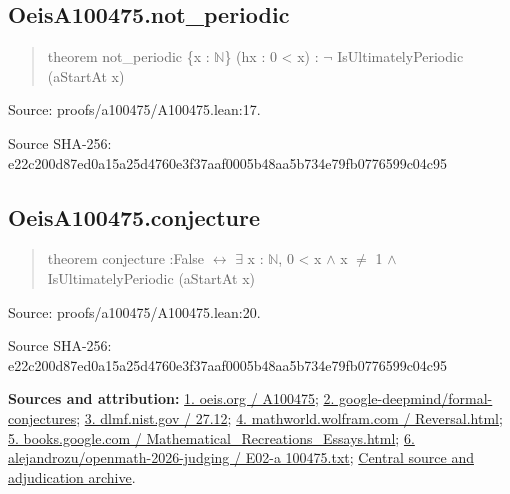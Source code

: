 \documentclass[11pt,a4paper]{article}
\begin{document}
\begin{samepage}
\subsection{OeisA100475.not\_periodic}
\begin{quote}\small\ttfamily theorem not\_periodic \{x : \ensuremath{\mathbb{N}}\} (hx : 0 < x) : \ensuremath{\neg} IsUltimatelyPeriodic (aStartAt x)\end{quote}
{\small Source: proofs/a100475/A100475.lean:17.\par}

{\small Source SHA-256: e22c200d87ed0a15a25d4760e3f37aaf0005b48aa5b734e79fb0776599c04c95\par}

\end{samepage}
\begin{samepage}
\subsection{OeisA100475.conjecture}
\begin{quote}\small\ttfamily theorem conjecture :\newline     False \ensuremath{\leftrightarrow} \ensuremath{\exists} x : \ensuremath{\mathbb{N}}, 0 < x \ensuremath{\wedge} x \ensuremath{\neq} 1 \ensuremath{\wedge} IsUltimatelyPeriodic (aStartAt x)\end{quote}
{\small Source: proofs/a100475/A100475.lean:20.\par}

{\small Source SHA-256: e22c200d87ed0a15a25d4760e3f37aaf0005b48aa5b734e79fb0776599c04c95\par}

{\small\textbf{Sources and attribution:} \href{https://oeis.org/A100475}{1. oeis.org / A100475}; \href{https://github.com/google-deepmind/formal-conjectures/pull/5567}{2. google-deepmind/formal-conjectures}; \href{https://dlmf.nist.gov/27.12\#E2}{3. dlmf.nist.gov / 27.12}; \href{https://mathworld.wolfram.com/Reversal.html}{4. mathworld.wolfram.com / Reversal.html}; \href{https://books.google.com/books/about/Mathematical_Recreations_Essays.html?id=9lJqNJhYc9oC}{5. books.google.com / Mathematical\_Recreations\_Essays.html}; \href{https://github.com/alejandrozu/openmath-2026-judging/blob/d0ed487f487fa7ec814ff705ab55249983fe8707/OpenMath-Judging/review/entries/E02-a100475.txt}{6. alejandrozu/openmath-2026-judging / E02-a 100475.txt}; \href{https://github.com/alejandrozu/openmath-2026-judging}{Central source and adjudication archive}.\par}

\end{samepage}
\clearpage
\end{document}
